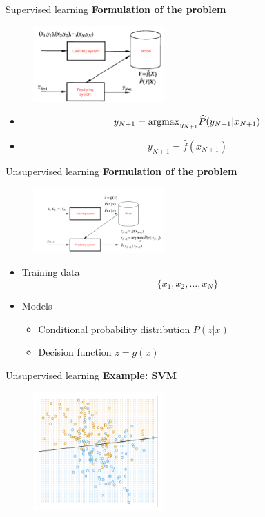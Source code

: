 \documentclass{beamer}
\begin{document}
\begin{frame}{Supervised learning}
\textbf{Formulation of the problem}
\begin{figure}
\centering
\includegraphics[width=5cm]{ep12.png}
\end{figure}
\begin{itemize}
\item 
$$
y_{N+1} = {\rm argmax}_{y_{N+1}}\widehat{P}(y_{N+1}|x_{N+1})
$$
\item 
$$
y_{N+1} = \widehat{f}(x_{N+1})
$$
\end{itemize}
\end{frame}

\begin{frame}{Unsupervised learning}
\textbf{Formulation of the problem}
\begin{figure}
\centering
\includegraphics[width=5cm]{ep13.png}
\end{figure}
\begin{itemize}
\item Training data $$\{x_1, x_2, \ldots, x_N\}$$
\item Models
\begin{itemize}
\item Conditional probability distribution $P(z|x)$
\item Decision function $z = g(x)$
\end{itemize}
\end{itemize}
\end{frame}

\begin{frame}{Unsupervised learning}
\textbf{Example: SVM}
\begin{figure}
\centering
\includegraphics[width=5cm]{ep15.png}
\end{figure}
\end{frame}
\end{document}
